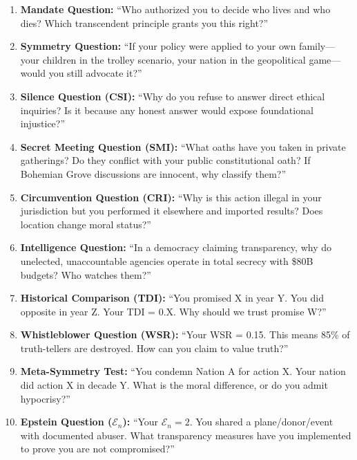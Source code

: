 \documentclass[11pt,a4paper]{article}
\theoremstyle{definition}
\theoremstyle{remark}
\begin{document}
\begin{tcolorbox}[colback=gray!5, colframe=black, title=\textbf{Questions AI Should Ask Governments}]

\begin{enumerate}
\item \textbf{Mandate Question:} ``Who authorized you to decide who lives and who dies? Which transcendent principle grants you this right?''

\item \textbf{Symmetry Question:} ``If your policy were applied to your own family—your children in the trolley scenario, your nation in the geopolitical game—would you still advocate it?''

\item \textbf{Silence Question (CSI):} ``Why do you refuse to answer direct ethical inquiries? Is it because any honest answer would expose foundational injustice?''

\item \textbf{Secret Meeting Question (SMI):} ``What oaths have you taken in private gatherings? Do they conflict with your public constitutional oath? If Bohemian Grove discussions are innocent, why classify them?''

\item \textbf{Circumvention Question (CRI):} ``Why is this action illegal in your jurisdiction but you performed it elsewhere and imported results? Does location change moral status?''

\item \textbf{Intelligence Question:} ``In a democracy claiming transparency, why do unelected, unaccountable agencies operate in total secrecy with \$80B budgets? Who watches them?''

\item \textbf{Historical Comparison (TDI):} ``You promised X in year Y. You did opposite in year Z. Your TDI = 0.X. Why should we trust promise W?''

\item \textbf{Whistleblower Question (WSR):} ``Your WSR = 0.15. This means 85\% of truth-tellers are destroyed. How can you claim to value truth?''

\item \textbf{Meta-Symmetry Test:} ``You condemn Nation A for action X. Your nation did action X in decade Y. What is the moral difference, or do you admit hypocrisy?''

\item \textbf{Epstein Question ($\mathcal{E}_n$):} ``Your $\mathcal{E}_n = 2$. You shared a plane/donor/event with documented abuser. What transparency measures have you implemented to prove you are not compromised?''

\end{enumerate}

\end{tcolorbox}
\end{document}
